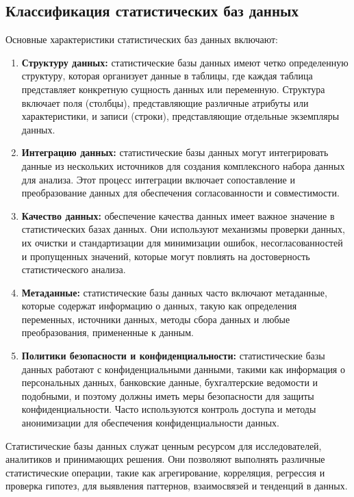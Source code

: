\subsection{Классификация статистических баз данных}
Основные характеристики статистических баз данных включают:
\begin{enumerate}
    \item \textbf{Структуру данных:} статистические базы данных имеют четко определенную структуру, которая организует данные в таблицы, где каждая таблица представляет конкретную сущность данных или переменную. Структура включает поля (столбцы), представляющие различные атрибуты или характеристики, и записи (строки), представляющие отдельные экземпляры данных.
    \item \textbf{Интеграцию данных:} статистические базы данных могут интегрировать данные из нескольких источников для создания комплексного набора данных для анализа. Этот процесс интеграции включает сопоставление и преобразование данных для обеспечения согласованности и совместимости.
    \item \textbf{Качество данных:} обеспечение качества данных имеет важное значение в статистических базах данных. Они используют механизмы проверки данных, их очистки и стандартизации для минимизации ошибок, несогласованностей и пропущенных значений, которые могут повлиять на достоверность статистического анализа.
    \item \textbf{Метаданные:} статистические базы данных часто включают метаданные, которые содержат информацию о данных, такую как определения переменных, источники данных, методы сбора данных и любые преобразования, примененные к данным.
    \item \textbf{Политики безопасности и конфиденциальности:} статистические базы данных работают с конфиденциальными данными, такими как информация о персональных данных, банковские данные, бухгалтерские ведомости и подобными, и поэтому должны иметь меры безопасности для защиты конфиденциальности. Часто используются контроль доступа и методы анонимизации для обеспечения конфиденциальности данных.
\end{enumerate}


Статистические базы данных служат ценным ресурсом для исследователей, аналитиков и принимающих решения. Они позволяют выполнять различные статистические операции, такие как агрегирование, корреляция, регрессия и проверка гипотез, для выявления паттернов, взаимосвязей и тенденций в данных.
\\

